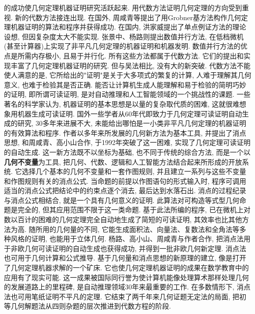 的成功使几何定理机器证明研究活跃起来. 用代数方法证明几何定理的方向受到重视. 新的代数方法接连出现. 在国外, 周咸青等提出了用Grobner基方法构作几何定理机器证明的算法和程序并获得成功. 在国内, 洪家威提出了单点例证方法的理论设想, 但因复杂度太大不能实现. 张景中、杨路则提出数值并行方法, 在低档微机(甚至计算器)上实现了非平凡几何定理的机器证明和机器发明. 数值并行方法的优点是所需内存极小, 且易于并行化. 所有这些方法都属于代数方法. 它们的提出和实现丰富了几何定理机器证明的研究. 但与吴法相比, 没有大的新突破. 代数方法不能使人满意的是, 它所给出的"证明"是关于大多项式的繁复的计算, 人难于理解其几何意义, 也难于检验其是否正确. 能否让计算机生成人能理解和易于检验的简明巧妙的证明, 即所谓可读证明, 是对自动推理和人工智能领域的一个挑战性的课题. 一些著名的科学家认为, 机器证明的基本思想是以量的复杂取代质的困难, 这就很难想象用机器生成可读证明. 国外一些学者从60年代即致力于几何定理可读证明自动生成的研究, 30多年来进展不大, 未能给出哪怕是一小类非平凡几何定理的机器证明的有效算法和程序. 作者以多年来所发展的几何新方法为基本工具, 并提出了消点思想, 和周咸青、高小山合作, 于1992年突破了这一困难, 实现了几何定理可读证明的自动生成. 这一新方法既不以坐标为基础, 也不同于传统的综合方法, 而是一个以\textbf{几何不变量}为工具, 把几何、代数、逻辑和人工智能方法结合起来所形成的开放系统. 它选择几个基本的几何不变量和一套作图规则, 并且建立一系列与这些不变量和作图规则有关的消点公式. 当命题的前提以作图语句的形式输入时, 程序可调用适当的消点公式把结论中的约束点逐个消去, 最后达到水落石出. 消点的过程纪录与消点公式相结合, 就是一个具有几何意义的证明. 此算法对可构造等式型几何命题是完全的, 但其应用范围不限于这一类命题. 基于此法所编的程序, 已在微机上对数以百计的困难的几何定理完全自动地生成了简短的可读证明, 其效率也比其他方法为高. 随所用的几何量的不同, 它能生成面积法、向量法、复数法和全角法等多种风格的证明, 也能用于立体几何. 杨路、高小山、周咸青与作者合作, 把消点法用于非欧几何可读证明的自动生成也获得成功, 并得到一批非欧几何新定理. 消点法也可用于几何计算和公式推导. 基于几何量和消点思想的新原理的建立, 像是打开了几何定理机器求解的一个矿床. 它也使几何定理机器证明的成果在数学教育中的应用有了现实可能. 这一成果被国际同行誉为使计算机能像处理算术那样处理几何的发展道路上的里程碑, 是自动推理领域30年来最重要的工作. 在多数情形下, 消点法也可用笔纸证明不平凡的定理. 它结束了两千年来几何证题无定法的局面, 把初等几何解题法从四则杂题的层次推进到代数方程的阶段.

